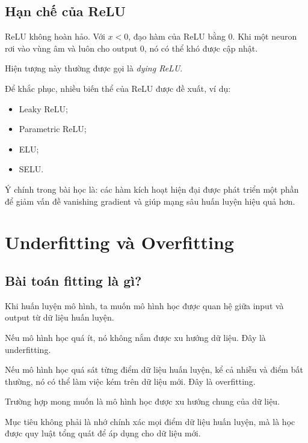 \documentclass[12pt,a4paper]{report}
\begin{document}
\section{Hạn chế của ReLU}

ReLU không hoàn hảo. Với $x<0$, đạo hàm của ReLU bằng 0. Khi một neuron rơi vào vùng âm và luôn cho output 0, nó có thể khó được cập nhật.

Hiện tượng này thường được gọi là \textit{dying ReLU}.

Để khắc phục, nhiều biến thể của ReLU được đề xuất, ví dụ:

\begin{itemize}
    \item Leaky ReLU;
    \item Parametric ReLU;
    \item ELU;
    \item SELU.
\end{itemize}

\begin{luuy}
Ý chính trong bài học là: các hàm kích hoạt hiện đại được phát triển một phần để giảm vấn đề vanishing gradient và giúp mạng sâu huấn luyện hiệu quả hơn.
\end{luuy}

\chapter{Underfitting và Overfitting}

\section{Bài toán fitting là gì?}

Khi huấn luyện mô hình, ta muốn mô hình học được quan hệ giữa input và output từ dữ liệu huấn luyện.

Nếu mô hình học quá ít, nó không nắm được xu hướng dữ liệu. Đây là underfitting.

Nếu mô hình học quá sát từng điểm dữ liệu huấn luyện, kể cả nhiễu và điểm bất thường, nó có thể làm việc kém trên dữ liệu mới. Đây là overfitting.

Trường hợp mong muốn là mô hình học được xu hướng chung của dữ liệu.

\begin{ghinho}
Mục tiêu không phải là nhớ chính xác mọi điểm dữ liệu huấn luyện, mà là học được quy luật tổng quát để áp dụng cho dữ liệu mới.
\end{ghinho}
\end{document}
